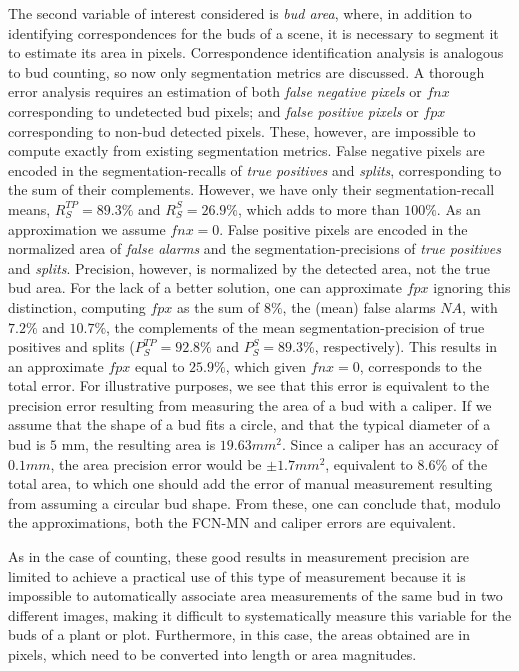 \documentclass[a4paper,authoryear,review]{elsarticle}
\begin{document}
The second variable of interest considered is \emph{bud area}, where, in addition to identifying correspondences for the buds of a scene, it is necessary to segment it to estimate its area in pixels. Correspondence identification analysis is analogous to bud counting, so now only segmentation metrics are discussed.
%
A thorough error analysis requires an estimation of both \emph{false negative pixels} or $fnx$ corresponding to undetected bud pixels; and \emph{false positive pixels} or $fpx$ corresponding to non-bud detected pixels. 
%
These, however, are impossible to compute exactly from existing segmentation metrics. 
%
False negative pixels are encoded in the segmentation-recalls of \emph{true positives}  and \emph{splits}, corresponding to the sum of their complements. However, we have only their segmentation-recall means, $R_S^{TP} = 89.3\%$ and $R_S^{S} = 26.9\%$, which adds to more than $100\%$. As an approximation we assume $fnx=0$.
%
False positive pixels are encoded in the normalized area of \emph{false alarms} and  the segmentation-precisions of \emph{true positives} and \emph{splits}. Precision, however, is normalized by the detected area, not the true bud area. For the lack of a better solution, one can approximate $fpx$ ignoring this distinction, computing $fpx$ as the sum of $8\%$, the (mean) false alarms $NA$, with $7.2\%$ and $10.7\%$, the complements of the mean segmentation-precision of  true positives and splits ($P_S^{TP}=92.8\%$ and $P_S^{S}=89.3\%$, respectively). This results in an approximate $fpx$ equal to $25.9\%$, which given $fnx=0$, corresponds to the total error. 
%
For illustrative purposes, we see that this error is equivalent to the precision error resulting from measuring the area of a bud with a caliper. If we assume that the shape of a bud fits a circle, and that the typical diameter of a bud is $5$ mm, the resulting area is $19.63 mm^2$. Since a caliper has an accuracy of $0.1 mm$, the area precision error would be $\pm 1.7 mm^2$, equivalent to $8.6\%$ of the total area, to which one should add the error of manual measurement resulting from assuming a circular bud shape. From these, one can conclude that, modulo the approximations, both the FCN-MN and caliper errors are equivalent.

As in the case of counting, these good results in measurement precision are limited to achieve a practical use of this type of measurement because it is impossible to automatically associate area measurements of the same bud in two different images, making it difficult to systematically measure this variable for the buds of a plant or plot. Furthermore, in this case, the areas obtained are in pixels, which need to be converted into length or area magnitudes.
\end{document}
